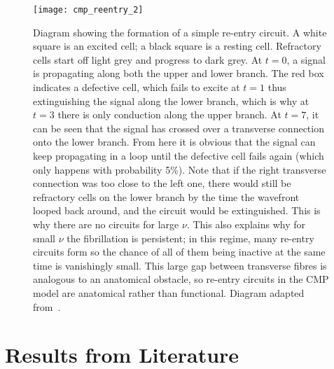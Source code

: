 \begin{figure} \begin{mdframed}
	\centering
	\texttt{[image: cmp\_reentry\_2]}
	\caption[short caption]{Diagram showing the formation of a simple re-entry circuit. A white square is an excited cell; a black square is a resting cell. Refractory cells start off light grey and progress to dark grey.
	At $t=0$, a signal is propagating along both the upper and lower branch. The red box indicates a defective cell, which fails to excite at $t=1$ thus extinguishing the signal along the lower branch, which is why at $t=3$ there is only conduction along the upper branch. At $t=7$, it can be seen that the signal has crossed over a transverse connection onto the lower branch. From here it is obvious that the signal can keep propagating in a loop until the defective cell fails again (which only happens with probability 5\%).
	Note that if the right transverse connection was too close to the left one, there would still be refractory cells on the lower branch by the time the wavefront looped back around, and the circuit would be extinguished. This is why there are no circuits for large $\nu$. This also explains why for small $\nu$ the fibrillation is persistent; in this regime, many re-entry circuits form so the chance of all of them being inactive at the same time is vanishingly small. 
	This large gap between transverse fibres is analogous to an anatomical obstacle, so re-entry circuits in the CMP model are anatomical rather than functional. Diagram adapted from~\cite{cmp}.}
	\label{fig:cmpreentry}
\end{mdframed} \end{figure}

\clearpage
\section{Results from Literature}


